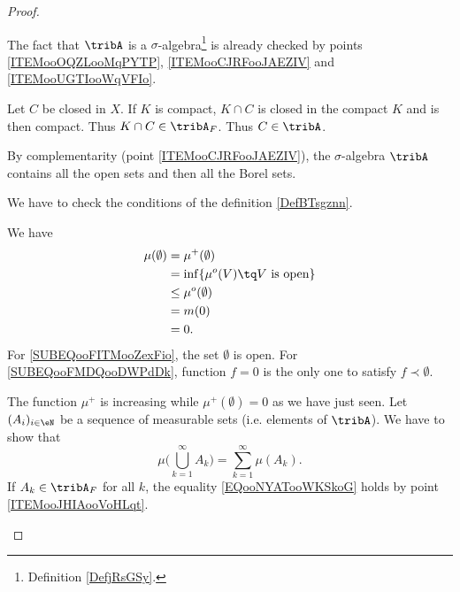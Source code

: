 \begin{proof}
\begin{subproof}

		The fact that \( \tribA\) is a \( \sigma\)-algebra\footnote{Definition \ref{DefjRsGSy}.} is already checked by points \ref{ITEMooOQZLooMqPYTP}, \ref{ITEMooCJRFooJAEZIV} and \ref{ITEMooUGTIooWqVFIo}.

		Let \( C\) be closed in \( X\). If \( K\) is compact, \( K\cap C\) is closed in the compact \( K\) and is then compact. Thus \( K\cap C\in\tribA_F\). Thus \( C\in \tribA\).

		By complementarity (point \ref{ITEMooCJRFooJAEZIV}), the \( \sigma\)-algebra \( \tribA\) contains all the open sets and then all the Borel sets.


		We have to check the conditions of the definition \ref{DefBTsgznn}.

		\begin{subproof}
			\spitem[\( \mu(0)=0\)]
			We have
			\begin{subequations}
				\begin{align}
					\mu(\emptyset) & =\mu^+(\emptyset)                                   \\
					               & =\inf\{ \mu^o(V)\tq \text{\( V\) is open} \}        \\
					               & \leq \mu^o(\emptyset)   \label{SUBEQooFITMooZexFio} \\
					               & = m(0)      \label{SUBEQooFMDQooDWPdDk}             \\
					               & =0.
				\end{align}
			\end{subequations}
			For \eqref{SUBEQooFITMooZexFio}, the set \( \emptyset\) is open. For \eqref{SUBEQooFMDQooDWPdDk}, function \( f=0\) is the only one to satisfy \( f\prec\emptyset\).

			The function \( \mu^+\) is increasing while \( \mu^+(\emptyset)= 0\) as we have just seen.
			Let \( (A_i)_{i\in \eN}\) be a sequence of measurable sets (i.e. elements of \( \tribA\)). We have to show that
			\begin{equation}        \label{EQooNYATooWKSkoG}
				\mu\big( \bigcup_{k=1}^{\infty}A_k \big)=\sum_{k=1}^{\infty}\mu(A_k).
			\end{equation}
			If \( A_k\in\tribA_F\) for all \( k\), the equality \eqref{EQooNYATooWKSkoG} holds by point \ref{ITEMooJHIAooVoHLqt}.


\end{subproof}
\end{subproof}
\end{proof}

